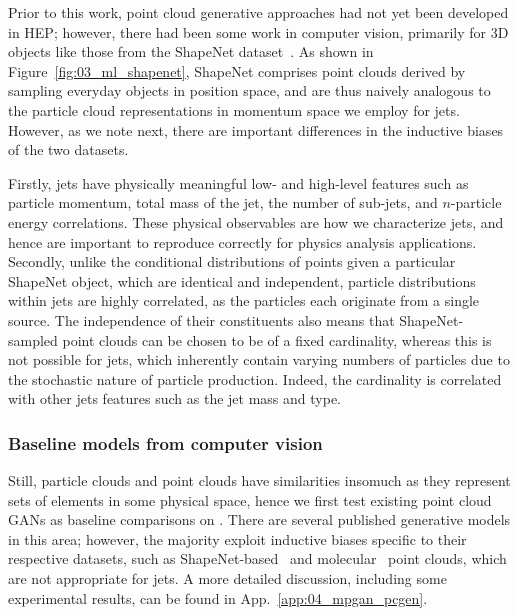 Prior to this work, point cloud generative approaches had not yet been developed in HEP; however, there had been some work in computer vision, primarily for 3D objects like those from the ShapeNet dataset~\cite{shapenet}.
As shown in Figure~\ref{fig:03_ml_shapenet}, ShapeNet comprises point clouds derived by sampling everyday objects in position space, and are thus naively analogous to the particle cloud representations in momentum space we employ for jets.
However, as we note next, there are important differences in the inductive biases of the two datasets.

Firstly, jets have physically meaningful low- and high-level features such as particle momentum, total mass of the jet, the number of sub-jets, and $n$-particle energy correlations.
These physical observables are how we characterize jets, and hence are important to reproduce correctly for physics analysis applications.
Secondly, unlike the conditional distributions of points given a particular ShapeNet object, which are identical and independent, particle distributions within jets are highly correlated, as the particles each originate from a single source.
The independence of their constituents also means that ShapeNet-sampled point clouds can be chosen to be of a fixed cardinality, whereas this is not possible for jets, which inherently contain varying numbers of particles due to the stochastic nature of particle production.
Indeed, the cardinality is correlated with other jets features such as the jet mass and type.

\subsubsection{Baseline models from computer vision}

Still, particle clouds and point clouds have similarities insomuch as they represent sets of elements in some physical space, hence we first test existing point cloud GANs as baseline comparisons on \jetnet.
There are several published generative models in this area; however, the majority exploit inductive biases specific to their respective datasets, such as ShapeNet-based~\cite{pcgan,pointflow,discretepointflow,ShapeGF} and molecular~\cite{kohler20,simm21,gschnet} point clouds, which are not appropriate for jets.
A more detailed discussion, including some experimental results, can be found in App.~\ref{app:04_mpgan_pcgen}.

